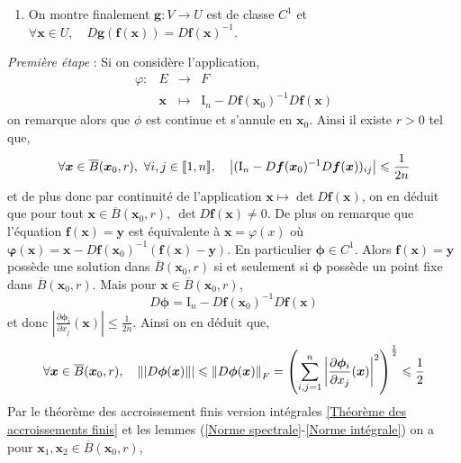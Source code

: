 {\begin{enumerate}
		\item On montre finalement $\bm g: V \to U$ est de classe $C^1$ et $\forall \bm x \in U, \quad D \bm g(\bm f(\bm x)) = D \bm f(\bm x)^{-1}$.
	\end{enumerate}
	\textit{Première étape} : Si on considère l'application,
	\[
	\begin{array}{cccc}
		\varphi : & E & \to &F \\
		& \bm x & \mapsto & \mathrm I_n - D\bm f(\bm x_0)^{-1} D\bm f(\bm x)
	\end{array}
	\]
	on remarque alors que $\phi$ est continue et s'annule en $\bm x_0$. Ainsi il existe $r > 0$ tel que,
	\[
	\forall \bm x \in \overline B(\bm x_0, r), ~\forall i,j \in \llbracket 1, n \rrbracket, \quad \left|(\mathrm I_n - D \bm f(\bm x_0)^{-1} D \bm f(\bm x))_{ij} \right| \leqslant \frac{1}{2n}
	\]
	et de plus donc par continuité de l'application $\bm x \mapsto \det D \bm f(\bm x)$, on en déduit que pour tout $\bm x \in \overline B(\bm x_0, r), ~\det D \bm f(\bm x) \neq 0$. De plus on remarque que l'équation $\bm f(\bm x) = \bm y$ est équivalente à $\bm x = \varphi (x)$ où $\bm \varphi (\bm x) = \bm x - D \bm f(\bm x_0)^{-1} (\bm f(\bm x) - \bm y)$. En particulier $\bm \phi \in C^1$. Alors $\bm f(\bm x) = \bm y$ possède une solution dans $\overline B(\bm x_0, r)$ si et seulement si $\bm \phi$ possède un point fixe dans $\overline B(\bm x_0, r)$. Mais pour $\bm x\in \overline B(\bm x_0, r)$, 
	\[
	D \bm \phi = \mathrm I_n - D \bm f(\bm x_0)^{-1} D \bm f(\bm x)
	\]
	et donc $\left| \frac{\partial \bm \phi_i}{\partial x_j}(\bm x) \right| \leqslant \frac{1}{2n}$. Ainsi on en déduit que,
	\[
	\forall \bm x \in \overline B(\bm x_0, r), \quad \|| D \bm \phi(\bm x) \|| \leqslant \left\| D \bm \phi(\bm x) \right\|_F = \left( \sum_{i,j = 1}^n \left|\frac{\partial \bm \phi_i}{\partial x_j}(\bm x)\right|^2\right)^{\frac{1}{2}} \leqslant \frac{1}{2}
	\]
	Par le théorème des accroissement finis version intégrales \ref{Théorème des accroissements finis} et les lemmes (\ref{Norme spectrale}-\ref{Norme intégrale}) on a pour $\bm x_1, \bm x_2 \in \overline B(\bm x_0, r)$,
	
}
